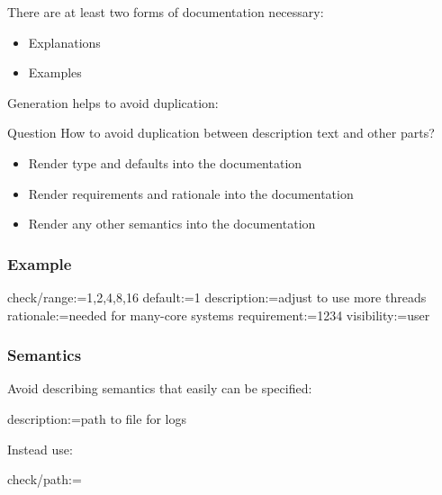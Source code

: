 \begin{frame}
	There are at least two forms of documentation necessary:

	\begin{itemize}
	\item Explanations
	\item Examples
	\end{itemize}

	Generation helps to avoid duplication:

\end{frame}

\begin{frame}
	\begin{alertblock}{Question}
	How to avoid duplication between description text and other parts?
	\end{alertblock}

	\pause

	\begin{itemize}
	\item Render type and defaults into the documentation
	\item Render requirements and rationale into the documentation
	\item Render any other semantics into the documentation
	\end{itemize}
\end{frame}

\begin{frame}[fragile]
	\frametitle{Example}

	\begin{code}
	  check/range:=1,2,4,8,16
	  default:=1
	  description:=adjust to use more threads
	  rationale:=needed for many-core systems
	  requirement:=1234
	  visibility:=user
	\end{code}
\end{frame}

\begin{frame}[fragile]
	\frametitle{Semantics}

	Avoid describing semantics that easily can be specified:

	\begin{code}
	  description:=path to file for logs
	\end{code}

	Instead use:

	\begin{code}
	  check/path:=
	\end{code}
\end{frame}

